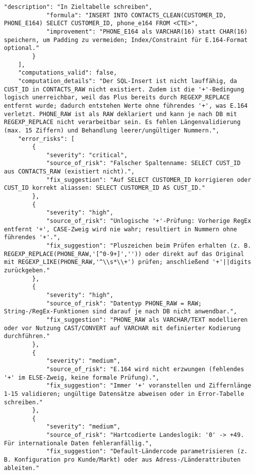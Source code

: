 \begin{lstlisting}[caption={Ausgabe: GPT-5 Anwendungsfall 3 Konsistenzdurchlauf},label={gpt_case3_prompt2}]
            "description": "In Zieltabelle schreiben",
            "formula": "INSERT INTO CONTACTS_CLEAN(CUSTOMER_ID, PHONE_E164) SELECT CUSTOMER_ID, phone_e164 FROM <CTE>",
            "improvement": "PHONE_E164 als VARCHAR(16) statt CHAR(16) speichern, um Padding zu vermeiden; Index/Constraint für E.164-Format optional."
        }
    ],
    "computations_valid": false,
    "computation_details": "Der SQL-Insert ist nicht lauffähig, da CUST_ID in CONTACTS_RAW nicht existiert. Zudem ist die '+'-Bedingung logisch unerreichbar, weil das Plus bereits durch REGEXP_REPLACE entfernt wurde; dadurch entstehen Werte ohne führendes '+', was E.164 verletzt. PHONE_RAW ist als RAW deklariert und kann je nach DB mit REGEXP_REPLACE nicht verarbeitbar sein. Es fehlen Längenvalidierung (max. 15 Ziffern) und Behandlung leerer/ungültiger Nummern.",
    "error_risks": [
        {
            "severity": "critical",
            "source_of_risk": "Falscher Spaltenname: SELECT CUST_ID aus CONTACTS_RAW (existiert nicht).",
            "fix_suggestion": "Auf SELECT CUSTOMER_ID korrigieren oder CUST_ID korrekt aliassen: SELECT CUSTOMER_ID AS CUST_ID."
        },
        {
            "severity": "high",
            "source_of_risk": "Unlogische '+'-Prüfung: Vorherige RegEx entfernt '+', CASE-Zweig wird nie wahr; resultiert in Nummern ohne führendes '+'.",
            "fix_suggestion": "Pluszeichen beim Prüfen erhalten (z. B. REGEXP_REPLACE(PHONE_RAW,'[^0-9+]','')) oder direkt auf das Original mit REGEXP_LIKE(PHONE_RAW,'^\\s*\\+') prüfen; anschließend '+'||digits zurückgeben."
        },
        {
            "severity": "high",
            "source_of_risk": "Datentyp PHONE_RAW = RAW; String-/RegEx-Funktionen sind darauf je nach DB nicht anwendbar.",
            "fix_suggestion": "PHONE_RAW als VARCHAR/TEXT modellieren oder vor Nutzung CAST/CONVERT auf VARCHAR mit definierter Kodierung durchführen."
        },
        {
            "severity": "medium",
            "source_of_risk": "E.164 wird nicht erzwungen (fehlendes '+' im ELSE-Zweig, keine formale Prüfung).",
            "fix_suggestion": "Immer '+' voranstellen und Ziffernlänge 1-15 validieren; ungültige Datensätze abweisen oder in Error-Tabelle schreiben."
        },
        {
            "severity": "medium",
            "source_of_risk": "Hartcodierte Landeslogik: '0' -> +49. Für internationale Daten fehleranfällig.",
            "fix_suggestion": "Default-Ländercode parametrisieren (z. B. Konfiguration pro Kunde/Markt) oder aus Adress-/Länderattributen ableiten."

\end{lstlisting}
